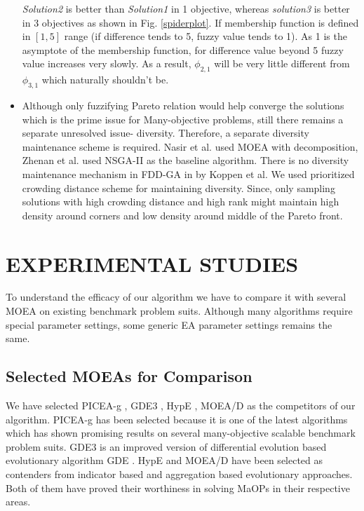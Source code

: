 \documentclass[journal]{IEEEtran}
\begin{document}
\begin{itemize}
\textit{Solution2} is better than \textit{Solution1} in 1 objective, whereas \textit{solution3} is better in 3 objectives as shown in Fig. \ref{spiderplot}. If membership function is defined in $[1,5]$ range (if difference tends to 5, fuzzy value tends to 1). As 1 is the asymptote of the membership function, for difference value beyond 5 fuzzy value increases very slowly. As a result, $\phi_{2,1}$ will be very little different from $\phi_{3,1}$ which naturally shouldn't be.


\item Although only fuzzifying Pareto relation would help converge the solutions which is the prime issue for Many-objective problems, still there remains a separate unresolved issue- diversity. Therefore, a separate diversity maintenance scheme is required. Nasir et al. \cite{5949696} used MOEA with decomposition, Zhenan et al. \cite{he2014fuzzy} used NSGA-II as the baseline algorithm. There is no diversity maintenance mechanism in FDD-GA in \cite{koppen2003fuzzy} by Koppen et al. We used prioritized crowding distance scheme for maintaining diversity. Since, only sampling solutions with high crowding distance and high rank might maintain high density around corners and low density around middle of the Pareto front.
\end{itemize}

\section{EXPERIMENTAL STUDIES}
\label{sec:expstudies}

To understand the efficacy of our algorithm we have to compare it with several MOEA on existing benchmark problem suits. Although many algorithms require special parameter settings, some generic EA parameter settings remains the same.

\subsection{Selected MOEAs for Comparison}
We have selected PICEA-g \cite{wang2013preference}, GDE3 \cite{kukkonen2005gde3}, HypE \cite{bader2011hype}, MOEA/D \cite{zhang2007moea} as the competitors of our algorithm. PICEA-g has been selected because it is one of the latest algorithms which has shown promising results on several many-objective scalable benchmark problem suits. GDE3 is an improved version of differential evolution based evolutionary algorithm GDE \cite{lampinen2001s}. HypE and MOEA/D have been selected as contenders from indicator based and aggregation based evolutionary approaches. Both of them have proved their worthiness in solving MaOPs in their respective areas.
\end{document}
